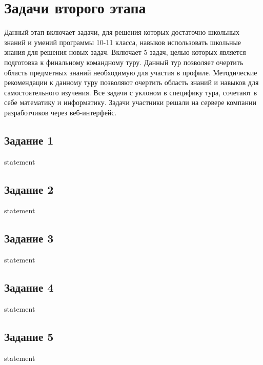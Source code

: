 \chapter{Задачи второго этапа}

Данный этап включает задачи, для решения которых достаточно школьных знаний и умений программы 10-11 класса, навыков использовать школьные знания для решения новых задач. Включает 5 задач, целью которых является подготовка к финальному командному туру.  Данный тур позволяет очертить область предметных знаний необходимую для участия в профиле. Методические рекомендации к данному туру позволяют очертить область знаний и навыков для самостоятельного изучения. Все задачи с уклоном в специфику тура, сочетают в себе математику и информатику. Задачи участники решали на сервере компании разработчиков через веб-интерфейс.

\section{Задание 1}

{statement}

\section{Задание 2}

{statement}

\section{Задание 3}

{statement}

\section{Задание 4}

{statement}

\section{Задание 5}

{statement}